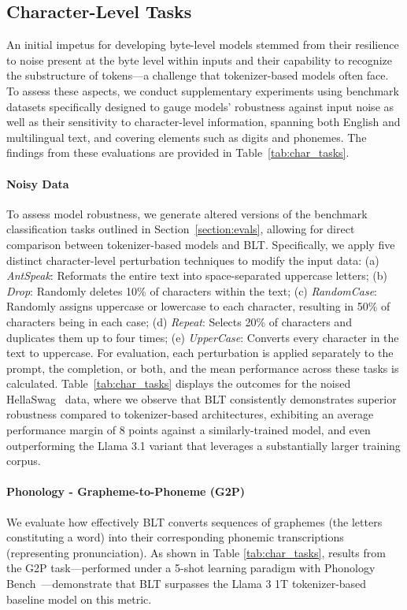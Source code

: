 \subsection{Character-Level Tasks}

An initial impetus for developing byte-level models stemmed from their resilience to noise present at the byte level within inputs and their capability to recognize the substructure of tokens—a challenge that tokenizer-based models often face. To assess these aspects, we conduct supplementary experiments using benchmark datasets specifically designed to gauge models’ robustness against input noise as well as their sensitivity to character-level information, spanning both English and multilingual text, and covering elements such as digits and phonemes. The findings from these evaluations are provided in Table~\ref{tab:char_tasks}.

\paragraph{Noisy Data} To assess model robustness, we generate altered versions of the benchmark classification tasks outlined in Section~\ref{section:evals}, allowing for direct comparison between tokenizer-based models and {\textsc BLT}. Specifically, we apply five distinct character-level perturbation techniques to modify the input data: (a) \textit{AntSpeak}: Reformats the entire text into space-separated uppercase letters; (b) \textit{Drop}: Randomly deletes 10\% of characters within the text; (c) \textit{RandomCase}: Randomly assigns uppercase or lowercase to each character, resulting in 50\% of characters being in each case; (d) \textit{Repeat}: Selects 20\% of characters and duplicates them up to four times; (e) \textit{UpperCase}: Converts every character in the text to uppercase. For evaluation, each perturbation is applied separately to the prompt, the completion, or both, and the mean performance across these tasks is calculated. Table~\ref{tab:char_tasks} displays the outcomes for the noised HellaSwag~\citep{Eval_hellaswag} data, where we observe that {\textsc BLT} consistently demonstrates superior robustness compared to tokenizer-based architectures, exhibiting an average performance margin of 8 points against a similarly-trained model, and even outperforming the Llama 3.1 variant that leverages a substantially larger training corpus.

\paragraph{Phonology - Grapheme-to-Phoneme (G2P)} We evaluate how effectively {\textsc BLT} converts sequences of graphemes (the letters constituting a word) into their corresponding phonemic transcriptions (representing pronunciation). As shown in Table \ref{tab:char_tasks}, results from the G2P task—performed under a 5-shot learning paradigm with Phonology Bench~\citep{suvarna2024phonologybench}—demonstrate that {\textsc BLT} surpasses the Llama 3 1T tokenizer-based baseline model on this metric.

